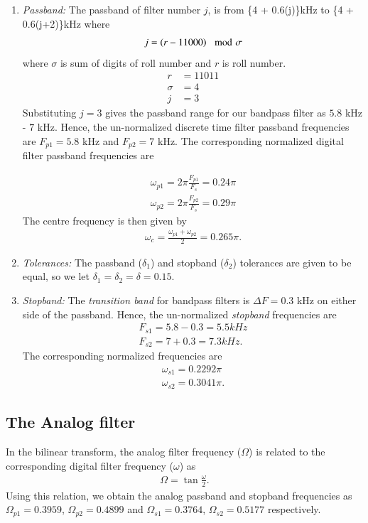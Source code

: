 \documentclass{article}
\begin{document}
\begin{enumerate}

\item {\em Passband:}  The passband of filter number $j$, is from \{4 + 0.6(j)\}kHz
to \{4 + 0.6(j+2)\}kHz where 
\begin{align}
    j=\left(r-11000\right) \mod \sigma
\end{align}
where $\sigma$ is sum of digits of roll number and $r$ is roll number.\\
\begin{align}
    r&=11011\\
    \sigma  &= 4\\
    j&=3
\end{align}  
Substituting $j = 3$ gives the passband range for our bandpass filter as $5.8$ kHz - $7$ kHz. 
 Hence, the un-normalized discrete time filter passband frequencies are $F_{p1} = 5.8$ kHz
and $F_{p2} = 7$ kHz.  The corresponding normalized digital filter passband frequencies are

\begin{align}
\omega_{p1} = 2\pi\frac{F_{p1}}{F_s}  = 0.24\pi  \\
 \omega_{p2} = 2\pi\frac{F_{p2}}{F_s}  = 0.29\pi
\end{align}  
 The centre frequency is then given by  
 \begin{align}
 \omega_c = \frac{\omega_{p1} + \omega_{p2}}{2} = 0.265\pi.  
 \end{align}

\item {\em Tolerances:}  The passband ($\delta_1$) and stopband ($\delta_2$) tolerances are given to
be equal, so we let $\delta_1 = \delta_2 = \delta = 0.15$.

\item {\em Stopband:}  The {\em transition band} for bandpass filters is $\Delta F = 0.3$ kHz on either side of the passband.
Hence, the un-normalized {\em stopband} frequencies are  
\begin{align}
F_{s1} = 5.8- 0.3 = 5.5 kHz \\
F_{s2} = 7 + 0.3 = 7.3 kHz .
 \end{align} 
The corresponding normalized frequencies are
\begin{align}
\omega_{s1} =  0.2292\pi \\
\omega_{s2} = 0.3041 \pi.
\end{align}
\end{enumerate}

\subsection{\textbf{The Analog filter}} \label{2.2}
In the bilinear transform, the analog filter frequency ($\Omega$) is related to the corresponding digital filter frequency ($\omega$) as
\begin{align}
\Omega = \tan \frac{\omega}{2}.
\end{align} 
 Using this relation, we obtain the analog passband and stopband frequencies as $\Omega_{p1} =0.3959 $, $\Omega_{p2} = 0.4899$ and $\Omega_{s1} = 0.3764$, $\Omega_{s2} =0.5177 $
respectively.
\end{document}
